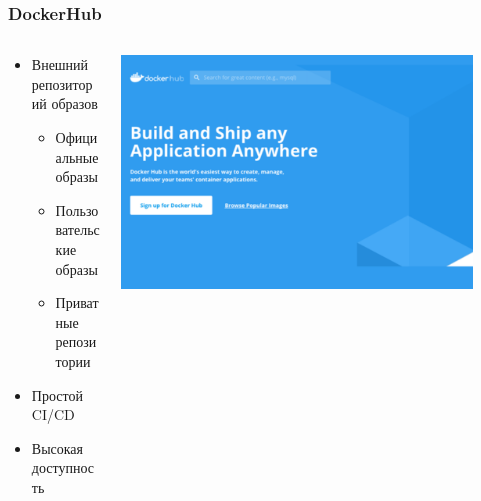 \documentclass{../../slides-style}
\begin{document}
    \begin{frame}
        \frametitle{DockerHub}
        \begin{columns}
            \begin{column}{0.5\textwidth}
                \begin{itemize}
                    \item Внешний репозиторий образов
                    \begin{itemize}
                        \item Официальные образы
                        \item Пользовательские образы
                        \item Приватные репозитории
                    \end{itemize}
                    \item Простой CI/CD
                    \item Высокая доступность
                \end{itemize}
            \end{column}
            \begin{column}{0.5\textwidth}
                \includegraphics[width=0.9\textwidth]{dockerHub.png}
            \end{column}
        \end{columns}
    \end{frame}
\end{document}
